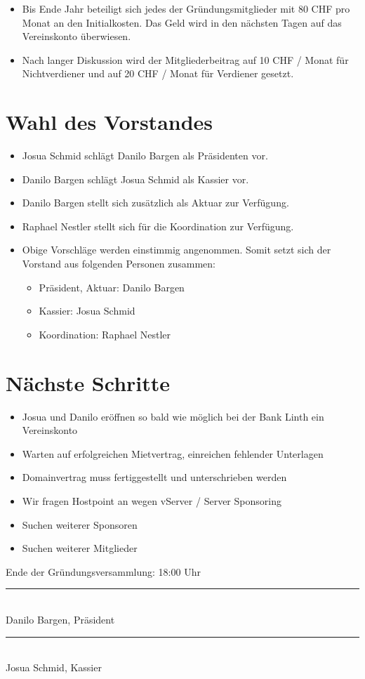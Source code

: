 \documentclass[10pt,a4paper,parskip,fleqn]{scrartcl}
\newcommand{\ul}{\begin{itemize}[itemsep=-0.3em,topsep=-0.3em]}
\newcommand{\lu}{\end{itemize}}
\newcommand{\li}{\item}
\begin{document}
\ul
	\li Bis Ende Jahr beteiligt sich jedes der Gründungsmitglieder mit 80 CHF pro
	Monat an den Initialkosten. Das Geld wird in den nächsten Tagen auf das
	Vereinskonto überwiesen.
	\li Nach langer Diskussion wird der Mitgliederbeitrag auf 10 CHF / Monat für
	Nichtverdiener und auf 20 CHF / Monat für Verdiener gesetzt.
\lu


\section{Wahl des Vorstandes}

\ul
	\li Josua Schmid schlägt Danilo Bargen als Präsidenten vor.
	\li Danilo Bargen schlägt Josua Schmid als Kassier vor.
	\li Danilo Bargen stellt sich zusätzlich als Aktuar zur Verfügung.
	\li Raphael Nestler stellt sich für die Koordination zur Verfügung.
	\li Obige Vorschläge werden einstimmig angenommen. Somit setzt sich der
	Vorstand aus folgenden Personen zusammen:
		\ul
			\li Präsident, Aktuar: Danilo Bargen
			\li Kassier: Josua Schmid
			\li Koordination: Raphael Nestler
		\lu
\lu


\section{Nächste Schritte}

\ul
	\li Josua und Danilo eröffnen so bald wie möglich bei der Bank Linth ein
	Vereinskonto
	\li Warten auf erfolgreichen Mietvertrag, einreichen fehlender Unterlagen
	\li Domainvertrag muss fertiggestellt und unterschrieben werden
	\li Wir fragen Hostpoint an wegen vServer / Server Sponsoring
	\li Suchen weiterer Sponsoren
	\li Suchen weiterer Mitglieder
\lu

\vspace{1cm}

Ende der Gründungsversammlung: 18:00 Uhr

\vspace{2cm}

\begin{minipage}[t]{0.49\textwidth}
			\center
			\rule{5cm}{0.2mm}\\
			Danilo Bargen, Präsident
		\end{minipage}
		\begin{minipage}[t]{0.49\textwidth}
			\center
			\rule{5cm}{0.2mm}\\
			Josua Schmid, Kassier
		\end{minipage}
\end{document}
